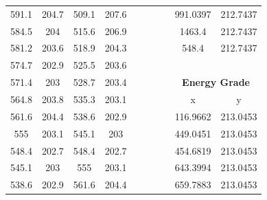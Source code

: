 \begin{center}
\begin{tabular}{|cccc||cccc||cc|}
    591.1    & 204.7                    & 509.1 & 207.6                         &          &                         &       &                               & 991.0397 & 212.7437                            \\
    584.5    & 204                      & 515.6 & 206.9                         &          &                         &       &                               & 1463.4   & 212.7437                            \\
    581.2    & 203.6                    & 518.9 & 204.3                         &          &                         &       &                               & 548.4    & 212.7437                            \\
    574.7    & 202.9                    & 525.5 & 203.6                         &          &                         &       &                               &          &                                     \\
    571.4    & 203                      & 528.7 & 203.4                         &          &                         &       &                               & \multicolumn{2}{c|}{\textbf{Energy Grade }}    \\ 
    \cline{9-10}
    564.8    & 203.8                    & 535.3 & 203.1                         &          &                         &       &                               & x        & y                                   \\
    561.6    & 204.4                    & 538.6 & 202.9                         &          &                         &       &                               & 116.9662 & 213.0453                            \\
    555      & 203.1                    & 545.1 & 203                           &          &                         &       &                               & 449.0451 & 213.0453                            \\
    548.4    & 202.7                    & 548.4 & 202.7                         &          &                         &       &                               & 454.6819 & 213.0453                            \\
    545.1    & 203                      & 555   & 203.1                         &          &                         &       &                               & 643.3994 & 213.0453                            \\
    538.6    & 202.9                    & 561.6 & 204.4                         &          &                         &       &                               & 659.7883 & 213.0453                            \\

\end{tabular}
\end{center}
